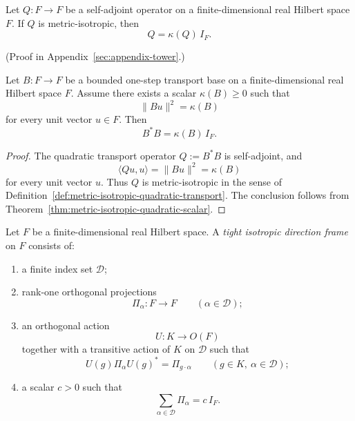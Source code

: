 \begin{theorem}
\label{thm:metric-isotropic-quadratic-scalar}
Let $Q:F\to F$ be a self-adjoint operator on a finite-dimensional real Hilbert
space $F$. If $Q$ is metric-isotropic, then
\[
Q=\kappa(Q)\,I_F.
\]
\end{theorem}

(Proof in Appendix~\ref{sec:appendix-tower}.)

\begin{corollary}
\label{cor:metric-isotropic-transport}
Let $B:F\to F$ be a bounded one-step transport base on a finite-dimensional
real Hilbert space $F$. Assume there exists a scalar $\kappa(B)\ge 0$ such that
\[
\|Bu\|^2=\kappa(B)
\]
for every unit vector $u\in F$. Then
\[
B^*B=\kappa(B)\,I_F.
\]
\end{corollary}

\begin{proof}
The quadratic transport operator $Q:=B^*B$ is self-adjoint, and
\[
\langle Qu,u\rangle=\|Bu\|^2=\kappa(B)
\]
for every unit vector $u$. Thus $Q$ is metric-isotropic in the sense of
Definition~\ref{def:metric-isotropic-quadratic-transport}. The conclusion
follows from Theorem~\ref{thm:metric-isotropic-quadratic-scalar}.
\end{proof}

\begin{definition}
\label{def:tight-isotropic-direction-frame}
Let $F$ be a finite-dimensional real Hilbert space. A
\emph{tight isotropic direction frame} on $F$ consists of:
\begin{enumerate}[label=(\roman*), leftmargin=2em, itemsep=0.2em]
\item a finite index set $\mathcal D$;
\item rank-one orthogonal projections
      \[
      \Pi_{\alpha}:F\to F
      \qquad(\alpha\in\mathcal D);
      \]
\item an orthogonal action
      \[
      U:K\to O(F)
      \]
      together with a transitive action of $K$ on $\mathcal D$ such that
      \[
      U(g)\Pi_{\alpha}U(g)^*=\Pi_{g\cdot \alpha}
      \qquad(g\in K,\ \alpha\in\mathcal D);
      \]
\item a scalar $c>0$ such that
      \[
      \sum_{\alpha\in\mathcal D}\Pi_{\alpha}=c\,I_F.
      \]
\end{enumerate}
\end{definition}

